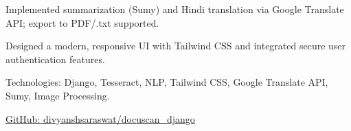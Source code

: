 \documentclass[]{deedy-resume-openfont}
\begin{document}
\begin{minipage}[t]{0.66\textwidth}
\begin{tightemize}
\item Implemented summarization (Sumy) and Hindi translation via Google Translate API; export to PDF/.txt supported.

\item Designed a modern, responsive UI with Tailwind CSS and integrated secure user authentication features.

\item Technologies: Django, Tesseract, NLP, Tailwind CSS, Google Translate API, Sumy, Image Processing.

\item \href{https://github.com/divyanshsaraswat/docuscan_django}{GitHub: divyanshsaraswat/docuscan\_django}

\end{tightemize}









\end{minipage}
\end{document}
